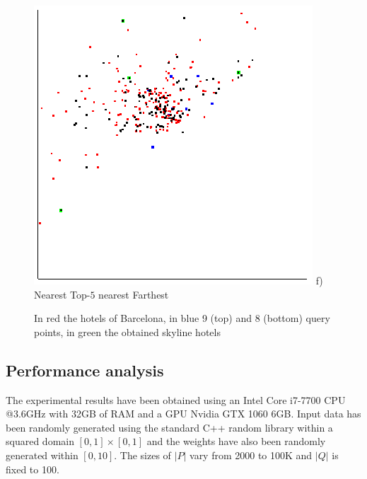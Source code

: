 \documentclass[11pt,onecolumn]{elsart3p}
\begin{document}
\begin{figure}[]
\begin{center}
          \includegraphics[width=0.3\linewidth]{img/bcn_farthest_all_1less.eps} f)
            \hspace{0.15\linewidth} Nearest \hspace{0.20\linewidth}  Top-$5$ nearest \hspace{0.20\linewidth}  Farthest
          \caption{In red the hotels of Barcelona, in blue 9 (top) and 8 (bottom) query points, in green the obtained skyline hotels %
          }\label{fig:bcn_region}
        \end{center}
     \end{figure}




\subsection{Performance analysis}\label{subsec:exp_res}

The experimental results have been obtained using an Intel Core i7-7700 CPU @3.6GHz with 32GB of RAM and a GPU Nvidia GTX 1060 6GB. Input data has been randomly generated using the standard C++ random library within a squared domain $[0,1]\times[0,1]$ and the weights have also been randomly generated within $[0,10]$. The sizes of $|P|$ vary from 2000 to 100K and $|Q|$ is fixed to 100.
\end{document}
